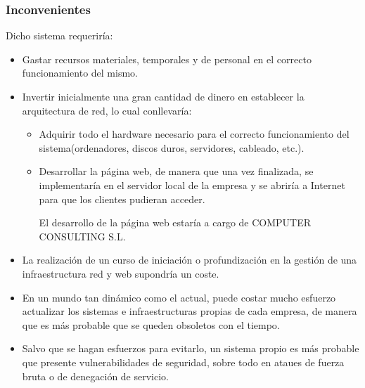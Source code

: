 \documentclass[12pt,letterpaper]{article}
\begin{document}
	\subsubsection{Inconvenientes}
	Dicho sistema requeriría:
	\begin{itemize}  
	\item Gastar recursos materiales, temporales y de personal en el correcto funcionamiento del mismo.
	\item Invertir inicialmente una gran cantidad de dinero en establecer la arquitectura de red, lo cual conllevaría:
	\begin{itemize}  
	\item Adquirir todo el hardware necesario para el correcto funcionamiento del sistema(ordenadores, discos duros, servidores, cableado, etc.).
	\item Desarrollar la página web, de manera que una vez finalizada, se implementaría en el servidor local de la empresa y se abriría a Internet para que los clientes pudieran acceder.\par El desarrollo de la página web estaría a cargo de COMPUTER CONSULTING S.L. 
	\end{itemize}
	\item La realización de un curso de iniciación o profundización en la gestión de una infraestructura red y web supondría un coste.
	
	\item En un mundo tan dinámico como el actual, puede costar mucho esfuerzo actualizar los sistemas e infraestructuras propias de cada empresa, de manera que es más probable que se queden obsoletos con el tiempo.
	
	\item Salvo que se hagan esfuerzos para evitarlo, un sistema propio  es más probable que presente vulnerabilidades de seguridad, sobre todo en ataues de fuerza bruta o de denegación de servicio.
	\end{itemize}
	
\end{document}
